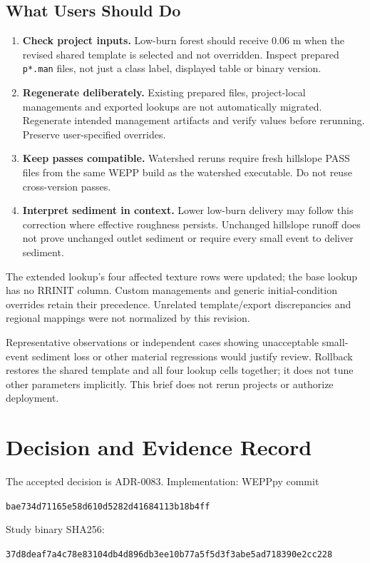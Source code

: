 \subsection{What Users Should Do}
\begin{enumerate}
\item \textbf{Check project inputs.} Low-burn forest should receive 0.06 m when
the revised shared template is selected and not overridden. Inspect prepared
\texttt{p*.man} files, not just a class label, displayed table or binary version.
\item \textbf{Regenerate deliberately.} Existing prepared files, project-local
managements and exported lookups are not automatically migrated. Regenerate
intended management artifacts and verify values before rerunning. Preserve
user-specified overrides.
\item \textbf{Keep passes compatible.} Watershed reruns require fresh hillslope
PASS files from the same WEPP build as the watershed executable.
Do not reuse cross-version passes.
\item \textbf{Interpret sediment in context.} Lower low-burn delivery may follow
this correction where effective roughness persists. Unchanged hillslope runoff
does not prove unchanged outlet sediment or require every small event to
deliver sediment.
\end{enumerate}

The extended lookup's four affected texture rows were updated; the base lookup
has no RRINIT column. Custom managements and generic initial-condition overrides
retain their precedence. Unrelated template/export discrepancies and regional
mappings were not normalized by this revision.

Representative observations or independent cases showing unacceptable
small-event sediment loss or other material regressions would justify review.
Rollback restores the shared template and all four lookup cells together;
it does not tune other parameters implicitly. This brief does not rerun projects
or authorize deployment.

\clearpage
\section{Decision and Evidence Record}
The accepted decision is ADR-0083. Implementation: WEPPpy commit
\par{\small\nolinkurl{bae734d71165e58d610d5282d41684113b18b4ff}}\par
Study binary SHA256:
\par{\small\nolinkurl{37d8deaf7a4c78e83104db4d896db3ee10b77a5f5d3f3abe5ad718390e2cc228}}\par

